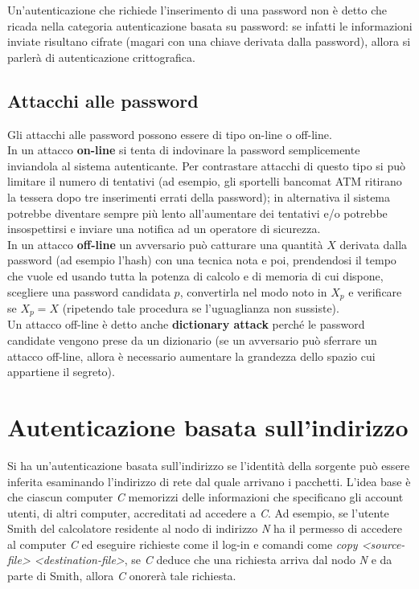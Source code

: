 Un'autenticazione che richiede l'inserimento di una password non è detto che ricada nella categoria autenticazione basata su password: se infatti le informazioni inviate risultano cifrate (magari con una chiave derivata dalla password), allora si parlerà di autenticazione crittografica.

\subsection{Attacchi alle password}
Gli attacchi alle password possono essere di tipo on-line o off-line.\\

In un attacco \textbf{on-line} si tenta di indovinare la password semplicemente inviandola al sistema autenticante. Per contrastare attacchi di questo tipo si può limitare il numero di tentativi (ad esempio, gli sportelli bancomat ATM ritirano la tessera dopo tre inserimenti errati della password); in alternativa il sistema potrebbe diventare sempre più lento all'aumentare dei tentativi e/o potrebbe insospettirsi e inviare una notifica ad un operatore di sicurezza.\\

In un attacco \textbf{off-line} un avversario può catturare una quantità $X$ derivata dalla password (ad esempio l'hash) con una tecnica nota e poi, prendendosi il tempo che vuole ed usando tutta la potenza di calcolo e di memoria di cui dispone, scegliere una password candidata $p$, convertirla nel modo noto in $X_{p}$ e verificare se $X_{p} = X$ (ripetendo tale procedura se l'uguaglianza non sussiste).\\
Un attacco off-line è detto anche \textbf{dictionary attack} perché le password candidate vengono prese da un dizionario (se un avversario può sferrare un attacco off-line, allora è necessario aumentare la grandezza dello spazio cui appartiene il segreto).

\section{Autenticazione basata sull'indirizzo}
Si ha un'autenticazione basata sull'indirizzo se l'identità della sorgente può essere inferita esaminando l'indirizzo di rete dal quale arrivano i pacchetti. L'idea base è che ciascun computer \textit{C} memorizzi delle informazioni che specificano gli account utenti, di altri computer, accreditati ad accedere a \textit{C}. Ad esempio, se l'utente Smith del calcolatore residente al nodo di indirizzo \textit{N} ha il permesso di accedere al computer \textit{C} ed eseguire richieste come il log-in e comandi come \textit{copy <source-file> <destination-file>}, se \textit{C} deduce che una richiesta arriva dal nodo \textit{N} e da parte di Smith, allora \textit{C} onorerà tale richiesta.\\

